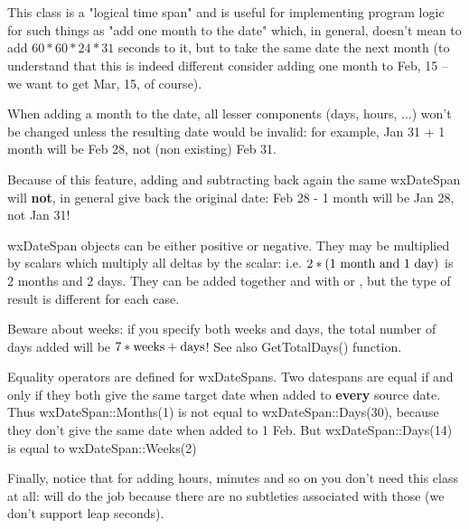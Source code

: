 
\section{}\label{wxdatespan}

This class is a "logical time span" and is useful for implementing program
logic for such things as "add one month to the date" which, in general,
doesn't mean to add $60*60*24*31$ seconds to it, but to take the same date
the next month (to understand that this is indeed different consider adding
one month to Feb, 15 -- we want to get Mar, 15, of course).

When adding a month to the date, all lesser components (days, hours, ...)
won't be changed unless the resulting date would be invalid: for example,
Jan 31 + 1 month will be Feb 28, not (non existing) Feb 31.

Because of this feature, adding and subtracting back again the same
wxDateSpan will {\bf not}, in general give back the original date: Feb 28 - 1
month will be Jan 28, not Jan 31!

wxDateSpan objects can be either positive or negative. They may be
multiplied by scalars which multiply all deltas by the scalar: i.e.
$2*(1 \hbox{ month and } 1 \hbox{ day})$ is $2$ months and $2$ days. They can
be added together and with  or 
, but the type of result is different for each
case.

Beware about weeks: if you specify both weeks and days, the total number of
days added will be $7*\hbox{weeks} + \hbox{days}$! See also GetTotalDays()
function.

Equality operators are defined for wxDateSpans. Two datespans are equal if
and only if they both give the same target date when added to {\bf every}
source date. Thus wxDateSpan::Months(1) is not equal to wxDateSpan::Days(30),
because they don't give the same date when added to 1 Feb. But
wxDateSpan::Days(14) is equal to wxDateSpan::Weeks(2)

Finally, notice that for adding hours, minutes and so on you don't need this
class at all:  will do the job because there
are no subtleties associated with those (we don't support leap seconds).

